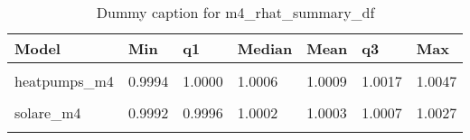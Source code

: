 \begin{table}
\centering
\caption{Dummy caption for m4_rhat_summary_df}
\centering
\fontsize{10}{12}\selectfont
\begin{tabular}[t]{lllllll}
\toprule
Model & Min & q1 & Median & Mean & q3 & Max\\
\midrule
\cellcolor{gray!10}{appliances\_m4} & \cellcolor{gray!10}{0.9992} & \cellcolor{gray!10}{0.9995} & \cellcolor{gray!10}{1.0002} & \cellcolor{gray!10}{1.0004} & \cellcolor{gray!10}{1.0012} & \cellcolor{gray!10}{1.0028}\\
heatpumps\_m4 & 0.9994 & 1.0000 & 1.0006 & 1.0009 & 1.0017 & 1.0047\\
\cellcolor{gray!10}{insulation\_m4} & \cellcolor{gray!10}{0.9992} & \cellcolor{gray!10}{0.9998} & \cellcolor{gray!10}{1.0005} & \cellcolor{gray!10}{1.0005} & \cellcolor{gray!10}{1.0011} & \cellcolor{gray!10}{1.0030}\\
solare\_m4 & 0.9992 & 0.9996 & 1.0002 & 1.0003 & 1.0007 & 1.0027\\
\cellcolor{gray!10}{windows\_m4} & \cellcolor{gray!10}{0.9992} & \cellcolor{gray!10}{0.9996} & \cellcolor{gray!10}{1.0003} & \cellcolor{gray!10}{1.0005} & \cellcolor{gray!10}{1.0013} & \cellcolor{gray!10}{1.0031}\\
\bottomrule
\end{tabular}
\end{table}
